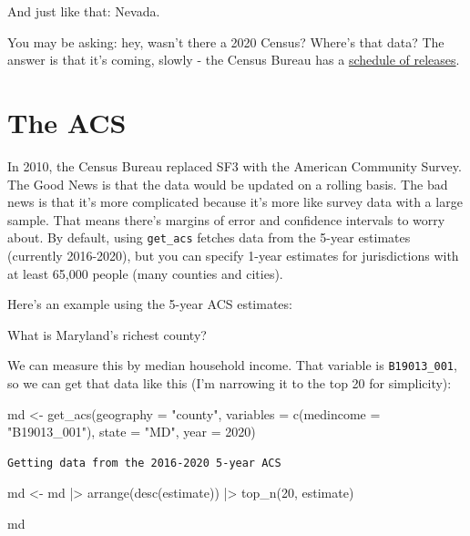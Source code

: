 \documentclass[
  letterpaper,
  DIV=11,
  numbers=noendperiod]{scrreprt}
\newenvironment{Shaded}{\begin{snugshade}}{\end{snugshade}}
\newcommand{\AttributeTok}[1]{\textcolor[rgb]{0.40,0.45,0.13}{#1}}
\newcommand{\DecValTok}[1]{\textcolor[rgb]{0.68,0.00,0.00}{#1}}
\newcommand{\FunctionTok}[1]{\textcolor[rgb]{0.28,0.35,0.67}{#1}}
\newcommand{\NormalTok}[1]{\textcolor[rgb]{0.00,0.23,0.31}{#1}}
\newcommand{\OtherTok}[1]{\textcolor[rgb]{0.00,0.23,0.31}{#1}}
\newcommand{\SpecialCharTok}[1]{\textcolor[rgb]{0.37,0.37,0.37}{#1}}
\newcommand{\StringTok}[1]{\textcolor[rgb]{0.13,0.47,0.30}{#1}}
\begin{document}
And just like that: Nevada.

You may be asking: hey, wasn't there a 2020 Census? Where's that data?
The answer is that it's coming, slowly - the Census Bureau has a
\href{https://www.census.gov/programs-surveys/popest/about/schedule.html}{schedule
of releases}.

\hypertarget{the-acs}{%
\section{The ACS}\label{the-acs}}

In 2010, the Census Bureau replaced SF3 with the American Community
Survey. The Good News is that the data would be updated on a rolling
basis. The bad news is that it's more complicated because it's more like
survey data with a large sample. That means there's margins of error and
confidence intervals to worry about. By default, using \texttt{get\_acs}
fetches data from the 5-year estimates (currently 2016-2020), but you
can specify 1-year estimates for jurisdictions with at least 65,000
people (many counties and cities).

Here's an example using the 5-year ACS estimates:

What is Maryland's richest county?

We can measure this by median household income. That variable is
\texttt{B19013\_001}, so we can get that data like this (I'm narrowing
it to the top 20 for simplicity):

\begin{Shaded}
\begin{Highlighting}[]
\NormalTok{md }\OtherTok{\textless{}{-}} \FunctionTok{get\_acs}\NormalTok{(}\AttributeTok{geography =} \StringTok{"county"}\NormalTok{,}
              \AttributeTok{variables =} \FunctionTok{c}\NormalTok{(}\AttributeTok{medincome =} \StringTok{"B19013\_001"}\NormalTok{),}
              \AttributeTok{state =} \StringTok{"MD"}\NormalTok{,}
              \AttributeTok{year =} \DecValTok{2020}\NormalTok{)}
\end{Highlighting}
\end{Shaded}

\begin{verbatim}
Getting data from the 2016-2020 5-year ACS
\end{verbatim}

\begin{Shaded}
\begin{Highlighting}[]
\NormalTok{md }\OtherTok{\textless{}{-}}\NormalTok{ md }\SpecialCharTok{|\textgreater{}} \FunctionTok{arrange}\NormalTok{(}\FunctionTok{desc}\NormalTok{(estimate)) }\SpecialCharTok{|\textgreater{}} \FunctionTok{top\_n}\NormalTok{(}\DecValTok{20}\NormalTok{, estimate)}

\NormalTok{md}
\end{Highlighting}
\end{Shaded}
\end{document}
